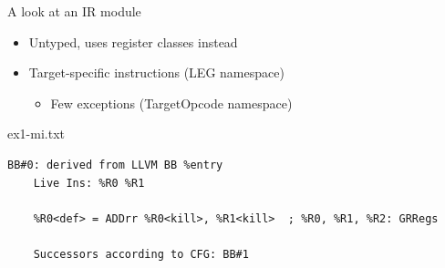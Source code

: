 
\begin{frame}[fragile]{A look at an IR module}

\begin{itemize}
    \item Untyped, uses register classes instead
    \item Target-specific instructions (LEG namespace)
    \begin{itemize}
        \item Few exceptions (TargetOpcode namespace)
    \end{itemize}
\end{itemize}

\begin{block}{ex1-mi.txt}
\begin{lstlisting}
BB#0: derived from LLVM BB %entry
    Live Ins: %R0 %R1

	%R0<def> = ADDrr %R0<kill>, %R1<kill>  ; %R0, %R1, %R2: GRRegs

    Successors according to CFG: BB#1
\end{lstlisting}
\end{block}

\end{frame}

